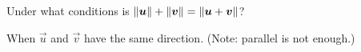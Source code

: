 
\begin{Exercise}[
name={},
title={}, 
difficulty=0,
origin={\cite{GHC}}]
Under what conditions is $\lVert\bm{u}\rVert+\lVert\bm{v}\rVert = \lVert\bm{u}+\bm{v}\rVert$?
\end{Exercise}

\begin{Answer}
When $\vec u$ and $\vec v$ have the same direction. (Note: parallel is not enough.)
\end{Answer}
